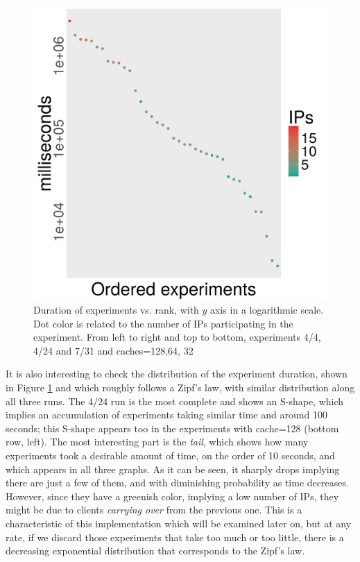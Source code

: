 \documentclass[letterpaper]{article}
\begin{document}
\begin{figure}[!htb]
\includegraphics[width=0.32\linewidth]{time-vs-rank-alife-32.png}
\caption{Duration of experiments vs. rank, with $y$ axis in a
  logarithmic scale. Dot color is related to the number of IPs
  participating in the experiment. From left to right and top to bottom, experiments
  4/4, 4/24 and 7/31 and caches=128,64, 32} 
\label{fig:zipf:os}
\end{figure}
%
It is also interesting to check the distribution of the experiment
duration, shown in Figure \ref{fig:zipf:os} and which roughly follows
a Zipf's law, with similar distribution along all three runs. The 4/24
run is the most complete and shows an S-shape, which implies an
accumulation of experiments taking similar time and around 100
seconds; this S-shape appears too in the experiments with cache=128
(bottom row, left). The most interesting part is the {\em tail}, which shows how
many experiments took a desirable amount of time, on the order of
10 seconds, and which appears in all three graphs. As it can be seen,
it sharply drops implying there are 
just a few of them, and with diminishing probability as time
decreases. However, since they have a greenish color, implying a low
number of IPs, they might be due to clients {\em carrying over} from
the previous one. This is a characteristic of this implementation
which will be examined later on, but at any rate, if we discard those
experiments that take too much or too little, there is a decreasing
exponential distribution that corresponds to the Zipf's law.
\end{document}
